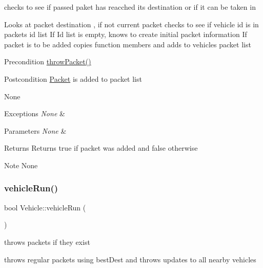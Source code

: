 checks to see if passed paket has reacched its destination or if it can be taken in 

Looks at packet destination , if not current packet checks to see if vehicle id is in packets id list If Id list is empty, knows to create initial packet information If packet is to be added copies function members and adds to vehicles packet list

\begin{DoxyPrecond}{Precondition}
\hyperlink{class_vehicle_a8858df03bffec647e3c72a58530a600b}{throw\+Packet()}
\end{DoxyPrecond}
\begin{DoxyPostcond}{Postcondition}
\hyperlink{struct_packet}{Packet} is added to packet list
\end{DoxyPostcond}
\begin{DoxyParagraph}{None}

\end{DoxyParagraph}

\begin{DoxyExceptions}{Exceptions}
{\em None} & \\
\hline
\end{DoxyExceptions}

\begin{DoxyParams}{Parameters}
{\em None} & \\
\hline
\end{DoxyParams}
\begin{DoxyReturn}{Returns}
Returns true if packet was added and false otherwise
\end{DoxyReturn}
\begin{DoxyNote}{Note}
None 
\end{DoxyNote}
\hypertarget{class_vehicle_ab49fda8bf7a04ff5321b377c55d7babd}{}\label{class_vehicle_ab49fda8bf7a04ff5321b377c55d7babd} 
\subsubsection{\texorpdfstring{vehicle\+Run()}{vehicleRun()}}
{\footnotesize\ttfamily bool Vehicle\+::vehicle\+Run (\begin{DoxyParamCaption}{ }\end{DoxyParamCaption})}



throws packets if they exist 

throws regular packets using best\+Dest and throws updates to all nearby vehicles

